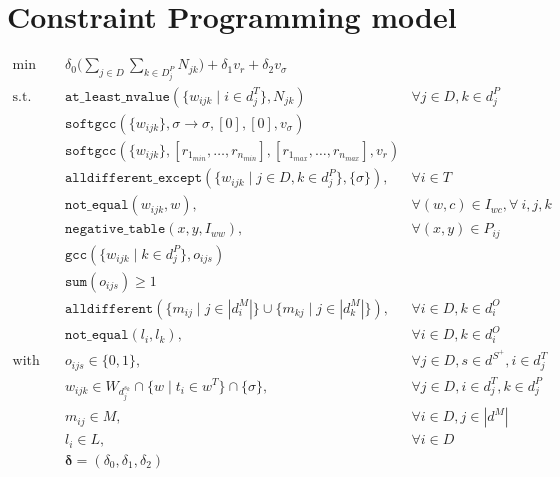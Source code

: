 \documentclass[../../thesis.tex]{subfiles}
\begin{document}
\chapter{Constraint Programming model}
 
\begin{align*}
  \text{min} \quad &\delta_0 \big( \sum_{j \in D} \sum_{k \in D^P_j} N_{jk} \big) + \delta_1 v_r + \delta_2 v_{\sigma} \\
  \text{s.t.} \quad &\texttt{at\_least\_nvalue}(\{ w_{ijk} \mid i \in d^T_j \}, N_{jk}) &\forall j \in D, k \in d^P_j \\
  &\texttt{softgcc}(\{ w_{ijk} \}, \sigma \rightarrow \sigma, [0], [0], v_{\sigma})  \\ 
  &\texttt{softgcc}(\{ w_{ijk} \}, [r_{1_{min}}, \dots, r_{n_{min}}], [r_{1_{max}}, \dots, r_{n_{max}}], v_{r}) \\
  &\texttt{alldifferent\_except}(\{w_{ijk} \mid j \in D, k \in d_j^P \}, \{ \sigma \}), &\forall i \in T \\ 
  &\texttt{not\_equal}(w_{ijk}, w),  &\forall (w, c) \in I_{wc}, \forall \ i, j, k \\
  &\texttt{negative\_table}(x, y, I_{ww}),  &\forall (x, y) \in P_{ij} \\ 
  &\texttt{gcc}(\{ w_{ijk} \mid k \in d^P_j \}, o_{ijs}) \\ 
  &\texttt{sum}(o_{ijs}) \geq 1 \\
  &\texttt{alldifferent}(\{ m_{ij} \mid j \in |d_i^M| \} \cup \{ m_{kj} \mid j \in |d_k^M| \}), &\forall i \in D, k \in d^O_i \\
  &\texttt{not_equal}(l_{i}, l_{k}), &\forall i \in D, k \in d^O_i \\
  \text{with} \quad & o_{ijs} \in \{ 0, 1 \}, & \forall j \in D, s \in d^{S^{+}}, i \in d^T_j \\ 
  &w_{ijk} \in W_{d^{s_k}_j} \cap \{ w \mid t_i \in w^T \} \cap \{ \sigma \},& \forall j \in D, i \in d^T_j, k \in d^P_j \\ 
  &m_{ij} \in M, & \forall i \in D, j \in |d^M| \\ 
  &l_{i} \in L, & \forall i \in D \\
  &\bm{\delta} = (\delta_0, \delta_1, \delta_2)
\end{align*}
\end{document}
